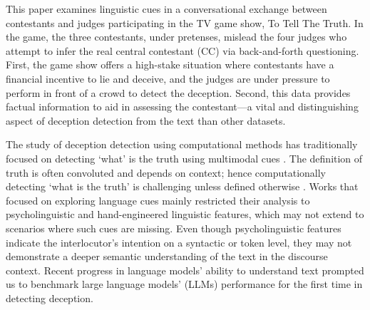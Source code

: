 This paper examines linguistic cues in a conversational exchange between contestants and judges participating in the TV game show, To Tell The Truth. In the game, the three contestants, under pretenses, mislead the four judges who attempt to infer the real central contestant (CC) via back-and-forth questioning. First, the game show offers a high-stake situation where contestants have a financial incentive to lie and deceive, and the judges are under pressure to perform in front of a crowd to detect the deception. Second, this data provides factual information to aid in assessing the contestant---a vital and distinguishing aspect of deception detection from the text than other datasets.



The study of deception detection using computational methods has traditionally focused on detecting `what' is the truth using multimodal cues \cite{soldner2019box}. The definition of truth is often convoluted and depends on context; hence computationally detecting `what is the truth' is challenging unless defined otherwise \cite{peskov2020takes}. Works that focused on exploring language cues \cite{fornaciari2013automatic,ott2013negative} mainly restricted their analysis to psycholinguistic and hand-engineered linguistic features, which may not extend to scenarios where such cues are missing. Even though psycholinguistic features indicate the interlocutor's intention on a syntactic or token level, they may not demonstrate a deeper semantic understanding of the text in the discourse context. Recent progress in language models' ability to understand text prompted us to benchmark large language models' (LLMs) performance for the first time in detecting deception.

